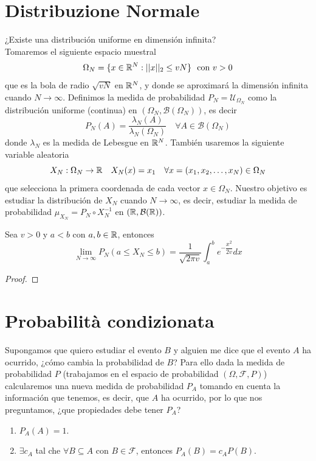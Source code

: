 \section{Distribuzione Normale}
 ¿Existe una distribución uniforme en dimensión infinita? \\
\noindent
Tomaremos el siguiente espacio muestral
\begin{equation*}
    \Omega_N=\{x\in \mathbb{R}^N: ||x||_2 \leq vN\} \ \text{ con } v>0
\end{equation*}
que es la bola de radio $\sqrt{vN}$ en $\mathbb{R}^N$, y donde se aproximará la dimensión infinita cuando $N\to \infty$. Definimos la medida de probabilidad $P_N=\mathcal{U}_{\Omega_N}$ como la distribución uniforme (continua) en $(\Omega_N, \mathcal{B}(\Omega_N))$, es decir
\begin{equation*}
    P_N(A) = \dfrac{\lambda_N(A)}{\lambda_N(\Omega_N)} \quad \forall A\in \mathcal{B}(\Omega_N)
\end{equation*}
donde $\lambda_N$ es la medida de Lebesgue en $\mathbb{R}^N$. También usaremos la siguiente variable aleatoria
\begin{equation*}
    X_N:\Omega_N \to \mathbb{R} \quad X_N(x) = x_1 \quad \forall x=(x_1, x_2, \ldots, x_N) \in \Omega_N
\end{equation*}
que selecciona la primera coordenada de cada vector $x\in \Omega_N$. Nuestro objetivo es estudiar la distribución de $X_N$ cuando $N\to \infty$, es decir, estudiar la medida de probabilidad $\mu_{X_N} = P_N \circ X_N^{-1}$ en $(\mathbb{R}, \mathcal{B}(\mathbb{R}))$. \\

\begin{teo}
    Sea $v>0$ y $a<b$ con $a,b\in \mathbb{R}$, entonces
    \begin{equation*}
        \lim_{N\to \infty} P_N(a\leq X_N \leq b) = \dfrac{1}{\sqrt{2\pi v}} \int_a^b e^{-\dfrac{x^2}{2v}} dx
    \end{equation*}
    \begin{proof}
    \end{proof}
\end{teo}

\section{Probabilità condizionata}
\noindent
Supongamos que quiero estudiar el evento $B$ y alguien me dice que el evento $A$ ha ocurrido, ¿cómo cambia la probabilidad de $B$? Para ello dada la medida de probabilidad $P$ (trabajamos en el espacio de probabilidad $(\Omega, \mathcal{F}, P)$) calcularemos una nueva medida de probabilidad $P_A$ tomando en cuenta la información que tenemos, es decir, que $A$ ha ocurrido, por lo que nos preguntamos, ¿que propiedades debe tener $P_A$? 
\begin{enumerate}[label=\arabic*)]
    \item $P_A(A)=1$.
    \item $\exists c_A$ tal che $\forall B\subseteq A$ con $B\in \mathcal{F}$, entonces $P_A(B)=c_A P(B)$.
\end{enumerate}


